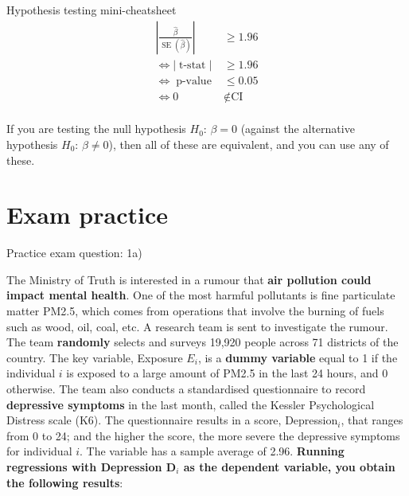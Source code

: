 \documentclass[11pt]{beamer}
\begin{document}
\begin{frame}{Hypothesis testing mini-cheatsheet}
\vspace{-0.2cm}
\LARGE
\begin{align*}
    \left| \frac{\hat{\beta}}{\operatorname{SE}(\hat{\beta})} \right| &\geq 1.96 \\ 
    \Leftrightarrow | \operatorname{t-stat}| &\geq 1.96 \\  \Leftrightarrow \operatorname{p-value} &\leq 0.05 \\
    \Leftrightarrow 0 &\notin \text{CI}
\end{align*}
\\
\normalsize \alert{If you are testing the null hypothesis $H_0$: $\beta = 0$ (against the alternative hypothesis $H_0$: $\beta \neq 0$), then all of these are equivalent, and you can use any of these.}

\end{frame}







\section{Exam practice}

\begin{frame}{Practice exam question: 1a)}

   \small{The Ministry of Truth is interested in a rumour that \textbf{air pollution could impact mental health}. One of the most harmful pollutants is fine particulate matter PM2.5, which comes from operations that involve the burning of fuels such as wood, oil, coal, etc. A research team is sent to investigate the rumour. The team \textbf{randomly} selects and surveys 19,920 people across 71 districts of the country. The key variable, Exposure $E_i$, is a \textbf{dummy variable} equal to 1 if the individual $i$ is exposed to a large amount of PM2.5 in the last 24 hours, and 0 otherwise. The team also conducts a standardised questionnaire to record \textbf{depressive symptoms} in the last month, called the Kessler Psychological Distress scale (K6). The questionnaire results in a score, Depression$_i$, that ranges from 0 to 24; and the higher the score, the more severe the depressive symptoms for individual $i$. The variable has a sample average of 2.96. \textbf{Running regressions with Depression D$_i$ as  the dependent variable, you obtain the following results}:
}
    
\end{frame}
\end{document}
